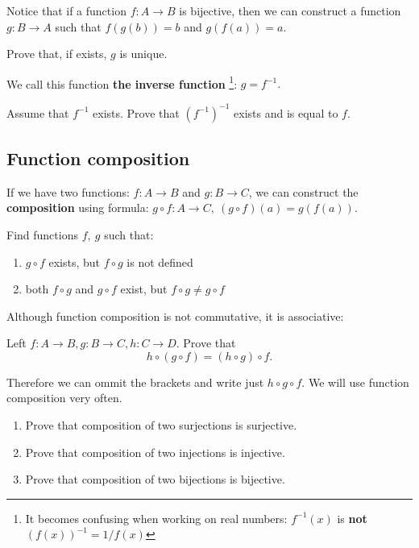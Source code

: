 \noindent Notice that if a function $f: A\to B$ is bijective, then we can construct a function $g:B\to A$
such that $f(g(b))=b$ and $g(f(a))=a$.
\begin{prob}
	Prove that, if exists, $g$ is unique.
\end{prob}

\noindent We call this function \textbf{the inverse function}
\footnote{It becomes confusing when working on real numbers: $f^{-1}(x)$ is
\textbf{not} $(f(x))^{-1}=1/f(x)$}: $g=f^{-1}.$

\begin{prob}
	Assume that $f^{-1}$ exists. Prove that $(f^{-1})^{-1}$ exists and is equal to $f$.
\end{prob}

\subsection{Function composition}
If we have two functions: $f:A\to B$ and $g: B\to C$, we can construct the \textbf{composition} using formula:
$g\circ f: A\to C,~(g\circ f)(a) = g(f(a)).$

\begin{prob}
	Find functions $f,~g$ such that:
	\begin{enumerate}
		\item $g\circ f$ exists, but $f\circ g$ is not defined
		\item both $f\circ g$ and $g\circ f$ exist, but $f\circ g\neq g\circ f$
	\end{enumerate}
\end{prob}

\noindent Although function composition is not commutative, it is associative:
\begin{prob}
	Left $f:A\to B, g: B\to C, h: C\to D$. Prove that
	$$h\circ (g\circ f) = (h\circ g)\circ f.$$
\end{prob}
Therefore we can ommit the brackets and write just $h\circ g\circ f.$ We will use function composition very
often.

\begin{prob}
    \begin{enumerate}
	   \item Prove that composition of two surjections is surjective.
	   \item Prove that composition of two injections is injective.
	   \item Prove that composition of two bijections is bijective.
    \end{enumerate}
\end{prob}

